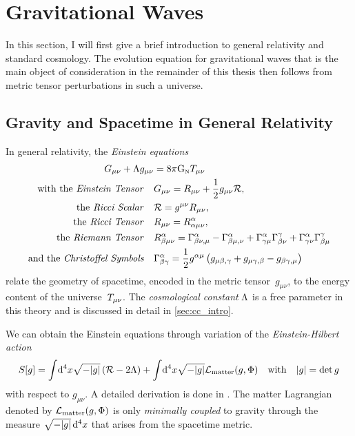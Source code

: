 \documentclass[12pt,parskip=half]{scrreprt}
\begin{document}
\section{Gravitational Waves}\label{sec:grav_waves}

In this section, I will first give a brief introduction to general relativity and standard \FLRW cosmology. The evolution equation for gravitational waves that is the main object of consideration in the remainder of this thesis then follows from metric tensor perturbations in such a universe.

\subsection{Gravity and Spacetime in General Relativity}\label{sec:gr}

In general relativity, the \emph{Einstein equations}
\begin{align}\label{eq:einstein_eqns}
	\Gtens_{\mu \nu} + \cosmconst g_{\mu\nu} &= 8 \pi \Newtconst \Ttens_{\mu \nu} \\
	\text{with the \emph{Einstein Tensor}} \quad &\Gtens_{\mu \nu} = \Rtens_{\mu \nu} + \frac{1}{2}g_{\mu \nu}\Rscal \eqpunct{,} \label{eq:einstein_tensor} \\
	\text{the \emph{Ricci Scalar}} \quad &\Rscal = g^{\mu \nu}\Rtens_{\mu \nu} \eqpunct{,} \\
	\text{the \emph{Ricci Tensor}} \quad &\Rtens_{\mu \nu} = \Riemtens^\alpha_{\alpha \mu \nu} \eqpunct{,} \\
	\text{the \emph{Riemann Tensor}} \quad &\Riemtens^\alpha_{\beta \mu \nu} = \Gamma^\alpha_{\beta \nu, \mu} - \Gamma^\alpha_{\beta \mu, \nu} + \Gamma^\alpha_{\gamma \mu}\Gamma^\gamma_{\beta \nu} + \Gamma^\alpha_{\gamma \nu}\Gamma^\gamma_{\beta \mu} \\
	\text{and the \emph{Christoffel Symbols}} \quad &\Gamma^\alpha_{\beta \gamma} = \frac{1}{2} g^{\alpha \mu} \del{g_{\mu \beta, \gamma} + g_{\mu \gamma, \beta} - g_{\beta \gamma, \mu}}
\end{align}
relate the geometry of spacetime, encoded in the metric tensor~\(g_{\mu \nu}\), to the energy content of the universe~\(T_{\mu \nu}\). The \emph{cosmological constant} \(\Lambda\) is a free parameter in this theory and is discussed in detail in \autoref{sec:cc_intro}.

We can obtain the Einstein equations through variation of the \emph{Einstein-Hilbert action}
\begin{align}\label{eq:einstein_hilbert_action}
	S[g] = \int \! \dif{^4x} \sqrt{-\metrdet{g}} \del{\Rscal - 2\cosmconst} + \int \! \dif{^4x} \sqrt{-\metrdet{g}} \lagrdensmatter \quad \text{with} \quad \metrdet{g} = \det{g}
\end{align}
with respect to \(g_{\mu \nu}\). A detailed derivation is done in . The matter Lagrangian denoted by \(\mathcal{L}_\textnormal{matter}(g,\Phi)\) is only \emph{minimally coupled} to gravity through the measure \(\sqrt{-\metrdet{g}}\dif{^4x}\) that arises from the spacetime metric.
\end{document}
